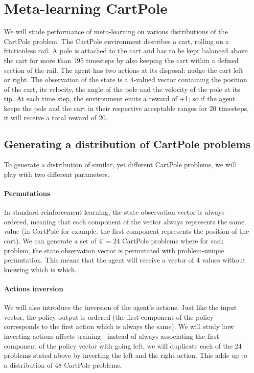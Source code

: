 \section{Meta-learning CartPole}
\label{sec:setting}
We will stude performance of meta-learning on various distributions of 
the CartPole problem. The CartPole environment describes a cart, rolling on 
a frictionless rail. A pole is attached to the cart and has to be kept balanced
above the cart for more than 195 timesteps by also keeping the cart within a 
defined section of the rail. The agent has two actions at its disposal: nudge
the cart left or right. The observation of the state is a 4-valued vector 
containing the position of the cart, its velocity, the angle of the pole and
the velocity of the pole at its tip. At each time step, the environment emits
a reward of +1; so if the agent keeps the pole and the cart in their 
respective acceptable ranges for 20 timesteps, it will receive a total reward
of 20.\\

\subsection{Generating a distribution of CartPole problems}
To generate a distribution of similar, yet different CartPole problems, we
will play with two different parameters.

\paragraph{Permutations} In standard reinforcement learning, the state
observation vector is always ordered, meaning that each component of the vector
always represents the same value (in CartPole for example, the first component
represents the position of the cart). We can generate a set of $4! = 24$
CartPole problems where for each problem, the state observation vector is
permutated with problem-unique permutation. This means that the agent will
receive a vector of 4 values without knowing which is which.

\paragraph{Actions inversion} We will also introduce the inversion of the
agent's actions. Just like the input vector, the policy output is ordered
(the first component of the policy corresponds to the first action which is
always the same). We will study how inverting actions affects training : instead
of always associating the first component of the policy vector with going left,
we will duplicate each of the 24 problems stated above by inverting the left
and the right action. This adds up to a distribution of 48 CartPole problems.

